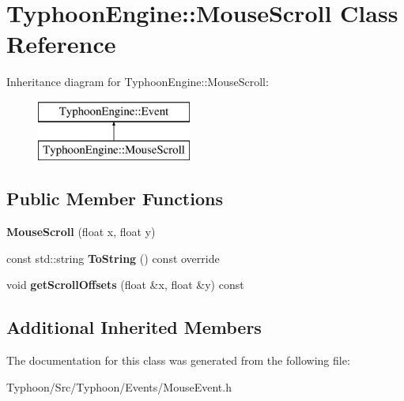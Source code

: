 \hypertarget{class_typhoon_engine_1_1_mouse_scroll}{}\section{Typhoon\+Engine\+::Mouse\+Scroll Class Reference}
\label{class_typhoon_engine_1_1_mouse_scroll}
Inheritance diagram for Typhoon\+Engine\+::Mouse\+Scroll\+:\begin{figure}[H]
\begin{center}
\leavevmode
\includegraphics[height=2.000000cm]{class_typhoon_engine_1_1_mouse_scroll}
\end{center}
\end{figure}
\subsection*{Public Member Functions}
\begin{DoxyCompactItemize}
\item 
\mbox{\label{class_typhoon_engine_1_1_mouse_scroll_abacbb7182abb0f4c57f76a144d8bedc3}} 
{\bfseries Mouse\+Scroll} (float x, float y)
\item 
\mbox{\label{class_typhoon_engine_1_1_mouse_scroll_ad61997156f406596c4feb6bfd42a0c24}} 
const std\+::string {\bfseries To\+String} () const override
\item 
\mbox{\label{class_typhoon_engine_1_1_mouse_scroll_ad2a9fa766abca843e3e4ff3da9ee053f}} 
void {\bfseries get\+Scroll\+Offsets} (float \&x, float \&y) const
\end{DoxyCompactItemize}
\subsection*{Additional Inherited Members}


The documentation for this class was generated from the following file\+:\begin{DoxyCompactItemize}
\item 
Typhoon/\+Src/\+Typhoon/\+Events/Mouse\+Event.\+h\end{DoxyCompactItemize}
